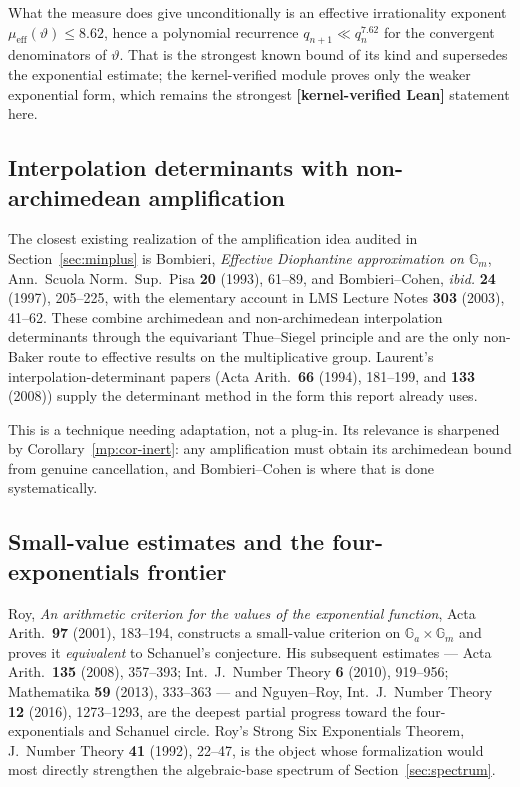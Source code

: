 \documentclass[11pt,oneside]{article}
\theoremstyle{definition}
\theoremstyle{remark}
\newcommand{\thetaq}{\vartheta}
\newcommand{\lean}[1]{\texttt{\detokenize{#1}}}
\newcommand{\statuslean}{\textcolor{leanblue}{\textbf{[kernel-verified Lean]}}}
\begin{document}
What the measure does give unconditionally is an effective irrationality exponent
$\mu_{\mathrm{eff}}(\thetaq)\le8.62$, hence a polynomial recurrence $q_{n+1}\ll q_n^{7.62}$ for
the convergent denominators of $\thetaq$.  That is the strongest known bound of its kind and
supersedes the exponential estimate; the kernel-verified module \lean{DenominatorGrowth} proves
only the weaker exponential form, which remains the strongest \statuslean{} statement here.

\subsection{Interpolation determinants with non-archimedean amplification}

The closest existing realization of the amplification idea audited in
Section~\ref{sec:minplus} is Bombieri, \emph{Effective Diophantine approximation on
$\mathbb G_m$}, Ann.\ Scuola Norm.\ Sup.\ Pisa \textbf{20} (1993), 61--89, and Bombieri--Cohen,
\emph{ibid.} \textbf{24} (1997), 205--225, with the elementary account in LMS Lecture Notes
\textbf{303} (2003), 41--62.  These combine archimedean and non-archimedean interpolation
determinants through the equivariant Thue--Siegel principle and are the only non-Baker route to
effective results on the multiplicative group.  Laurent's interpolation-determinant papers
(Acta Arith.\ \textbf{66} (1994), 181--199, and \textbf{133} (2008)) supply the determinant
method in the form this report already uses.

This is a technique needing adaptation, not a plug-in.  Its relevance is sharpened by
Corollary~\ref{mp:cor-inert}: any amplification must obtain its archimedean bound from genuine
cancellation, and Bombieri--Cohen is where that is done systematically.

\subsection{Small-value estimates and the four-exponentials frontier}

Roy, \emph{An arithmetic criterion for the values of the exponential function}, Acta Arith.\
\textbf{97} (2001), 183--194, constructs a small-value criterion on
$\mathbb G_a\times\mathbb G_m$ and proves it \emph{equivalent} to Schanuel's conjecture.  His
subsequent estimates --- Acta Arith.\ \textbf{135} (2008), 357--393; Int.\ J.\ Number Theory
\textbf{6} (2010), 919--956; Mathematika \textbf{59} (2013), 333--363 --- and Nguyen--Roy, Int.\
J.\ Number Theory \textbf{12} (2016), 1273--1293, are the deepest partial progress toward the
four-exponentials and Schanuel circle.  Roy's Strong Six Exponentials Theorem, J.\ Number
Theory \textbf{41} (1992), 22--47, is the object whose formalization would most directly
strengthen the algebraic-base spectrum of Section~\ref{sec:spectrum}.
\end{document}
